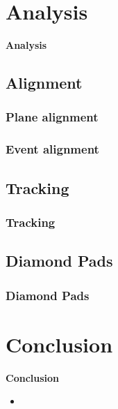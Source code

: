 \documentclass[9pt]{beamer}
\begin{document}
\section{Analysis}
\begin{frame}
	\begin{alertblock}{
		\begin{center}
			\Large{\textbf{Analysis}}
		\end{center}}
	\end{alertblock}
\end{frame}
\subsection{Alignment}
\begin{frame}
	\frametitle{Plane alignment}
\end{frame}
\begin{frame}
	\frametitle{Event alignment}
\end{frame}
\subsection{Tracking}
\begin{frame}
	\frametitle{Tracking}
\end{frame}
\subsection{Diamond Pads}
\begin{frame}
	\frametitle{Diamond Pads}
\end{frame}
\section{Conclusion}
\begin{frame}
	\begin{alertblock}{
		\begin{center}
			\Large{\textbf{Conclusion}}
		\end{center}}
	\end{alertblock}
\end{frame}
\begin{frame}
	\begin{itemize}
		\item
	\end{itemize}
\end{frame}
\end{document}
